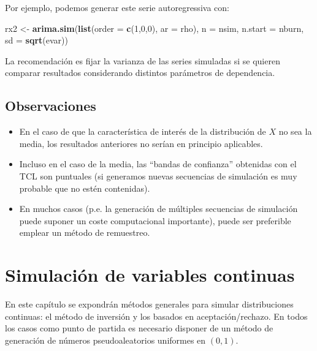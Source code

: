 \documentclass[
]{book}
\newenvironment{Shaded}{\begin{snugshade}}{\end{snugshade}}
\newcommand{\DataTypeTok}[1]{\textcolor[rgb]{0.13,0.29,0.53}{#1}}
\newcommand{\DecValTok}[1]{\textcolor[rgb]{0.00,0.00,0.81}{#1}}
\newcommand{\KeywordTok}[1]{\textcolor[rgb]{0.13,0.29,0.53}{\textbf{#1}}}
\newcommand{\NormalTok}[1]{#1}
\newcommand{\StringTok}[1]{\textcolor[rgb]{0.31,0.60,0.02}{#1}}
\theoremstyle{break}
\theoremstyle{definition}
\theoremstyle{definition}
\theoremstyle{definition}
\theoremstyle{remark}
\begin{document}
Por ejemplo, podemos generar este serie autoregressiva con:

\begin{Shaded}
\begin{Highlighting}[]
\NormalTok{rx2 <-}\StringTok{ }\KeywordTok{arima.sim}\NormalTok{(}\KeywordTok{list}\NormalTok{(}\DataTypeTok{order =} \KeywordTok{c}\NormalTok{(}\DecValTok{1}\NormalTok{,}\DecValTok{0}\NormalTok{,}\DecValTok{0}\NormalTok{), }\DataTypeTok{ar =}\NormalTok{ rho), }\DataTypeTok{n =}\NormalTok{ nsim, }\DataTypeTok{n.start =}\NormalTok{ nburn, }\DataTypeTok{sd =} \KeywordTok{sqrt}\NormalTok{(evar))}
\end{Highlighting}
\end{Shaded}

La recomendación es fijar la varianza de las series simuladas si se quieren comparar
resultados considerando distintos parámetros de dependencia.

\hypertarget{observaciones}{%
\section{Observaciones}\label{observaciones}}

\begin{itemize}
\item
  En el caso de que la característica de interés de la
  distribución de \(X\) no sea la media, los resultados anteriores
  no serían en principio aplicables.
\item
  Incluso en el caso de la media, las ``bandas de confianza''
  obtenidas con el TCL son puntuales (si generamos nuevas
  secuencias de simulación es muy probable que no
  estén contenidas).
\item
  En muchos casos (p.e. la generación de múltiples secuencias de
  simulación puede suponer un coste computacional importante),
  puede ser preferible emplear un método de remuestreo.
\end{itemize}

\hypertarget{simulaciuxf3n-de-variables-continuas}{%
\chapter{Simulación de variables continuas}\label{simulaciuxf3n-de-variables-continuas}}

En este capítulo se expondrán métodos generales para simular
distribuciones continuas: el método de inversión y los basados en
aceptación/rechazo. En todos los casos como punto de partida es necesario
disponer de un método de generación de números pseudoaleatorios uniformes en \((0,1)\).
\end{document}
